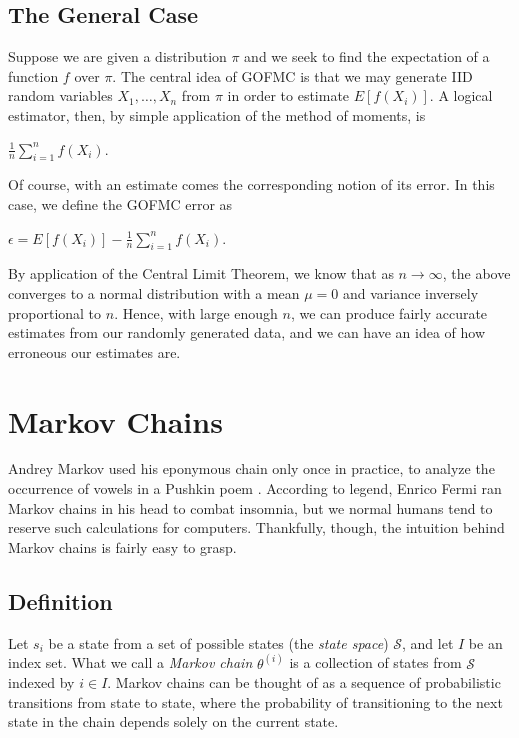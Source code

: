 \documentclass[12pt,twoside]{reedthesis}
\begin{document}
		\subsection*{The General Case}
			Suppose we are given a distribution $\pi$ and we seek to find the expectation of a function $f$ over $\pi$. The central idea of GOFMC is that we may generate IID random variables $X_1, \ldots, X_n$ from $\pi$ in order to estimate $E[f(X_i)]$. A logical estimator, then, by simple application of the method of moments, is 
			\begin{center}
				$\displaystyle\frac{1}{n}\displaystyle\sum_{i=1}^{n}{f(X_i)}$.
			\end{center}		
			Of course, with an estimate comes the corresponding notion of its error. 
			In this case, we define the GOFMC error as
			\begin{center}
				$\epsilon = E[f(X_i)] - \displaystyle\frac{1}{n}\displaystyle\sum_{i=1}^{n}f(X_i)$.
			\end{center}
			By application of the Central Limit Theorem, we know that as $n \rightarrow \infty$, the above converges to a normal distribution with a mean $\mu = 0$ and variance inversely proportional to $n$.
			Hence, with large enough $n$, we can produce fairly accurate estimates from our randomly generated data, and we can have an idea of how erroneous our estimates are. 
	\section{Markov Chains}
	Andrey Markov used his eponymous chain only once in practice, to analyze the occurrence of vowels in a Pushkin poem \cite{hist}. According to legend, Enrico Fermi ran Markov chains in his head to combat insomnia, but we normal humans tend to reserve such calculations for computers. Thankfully, though, the intuition behind Markov chains is fairly easy to grasp.
	 
	 			\subsection*{Definition}
			Let $s_i$ be a state from a set of possible states (the {\em state space}) $\mathcal S$, and let $I$ be an index set. What we call a {\em Markov chain} $\theta^{(i)}$ is a collection of states from $\mathcal S$ indexed by $i \in I$. Markov chains can be thought of as a sequence of probabilistic transitions from state to state, where the probability of transitioning to the next state in the chain depends solely on the current state. 
			
\end{document}
